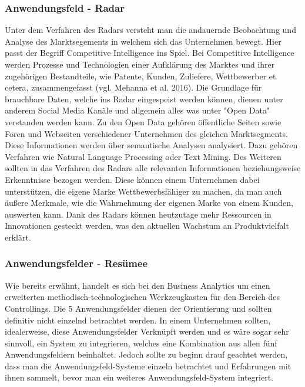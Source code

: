 \documentclass[12pt,twocolumn,twoside]{conference}   %
\begin{document}
\subsubsection{Anwendungsfeld - Radar}
Unter dem Verfahren des Radars versteht man die andauernde Beobachtung und Analyse des Marktsegements in welchem sich das Unternehmen bewegt. Hier passt der Begriff Competitive Intelligence ins Spiel. Bei Competitive Intelligence werden Prozesse und Technologien einer Aufklärung des Marktes und ihrer zugehörigen Bestandteile, wie Patente, Kunden, Zuliefere, Wettbewerber et cetera, zusammengefasst (vgl. Mehanna et al. 2016). 
Die Grundlage für brauchbare Daten, welche ins Radar eingespeist werden können, dienen unter anderem Social Media Kanäle und allgemein alles was unter "Open Data" verstanden werden kann. Zu den Open Data gehören öffentliche Seiten sowie Foren und Webseiten verschiedener Unternehmen des gleichen Marktsegments. Diese Informationen werden über semantische Analysen analysiert. Dazu gehören Verfahren wie Natural Language Processing oder Text Mining. Des Weiteren sollten in das Verfahren des Radars alle relevanten Informationen beziehungsweise Erkenntnisse bezogen werden. Diese können einem Unternehmen dabei unterstützen, die eigene Marke Wettbewerbsfähiger zu machen, da man auch äußere Merkmale, wie die Wahrnehmung der eigenen Marke von einem Kunden, auswerten kann. Dank des Radars können heutzutage mehr Ressourcen in Innovationen gesteckt werden, was den aktuellen Wachstum an Produktvielfalt erklärt.

\subsubsection{Anwendungsfelder - Resümee}
Wie bereits erwähnt, handelt es sich bei den Business Analytics um einen erweiterten methodisch-technologischen Werkzeugkasten für den Bereich des Controllings. Die 5 Anwendungsfelder dienen der Orientierung und sollten definitiv nicht einzelnd betrachtet werden. In einem Unternehmen sollten, idealerweise, diese Anwendungsfelder Verknüpft werden und es wäre sogar sehr sinnvoll, ein System zu integrieren, welches eine Kombination aus allen fünf Anwendungsfeldern beinhaltet. Jedoch sollte zu beginn drauf geachtet werden, dass man die Anwendungsfeld-Systeme einzeln betrachtet und Erfahrungen mit ihnen sammelt, bevor man ein weiteres Anwendungsfeld-System integriert. 
\end{document}
